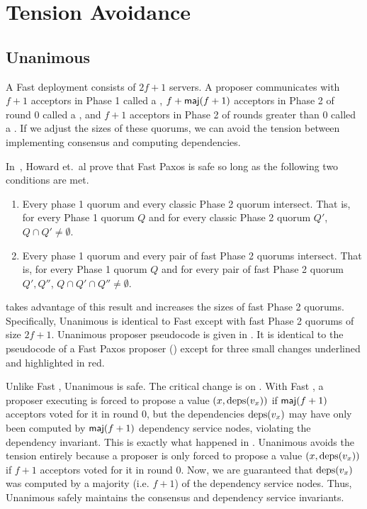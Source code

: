 \section{Tension Avoidance}

\subsection{Unanimous \BPaxos{}}
A Fast \BPaxos{} deployment consists of $2f+1$ servers. A proposer communicates
with $f+1$ acceptors in Phase 1 called a , $f +
\textsf{maj}(f+1)$ acceptors in Phase 2 of round $0$ called a , and $f + 1$ acceptors in Phase 2 of rounds greater than $0$ called a
. If we adjust the sizes of these quorums, we
can avoid the tension between implementing consensus and computing
dependencies.

In~\cite{howard2021fast}, Howard et.\ al prove that Fast Paxos is safe so long
as the following two conditions are met.
\begin{enumerate}
  \item
    Every phase 1 quorum and every classic Phase 2 quorum intersect. That is,
    for every Phase 1 quorum $Q$ and for every classic Phase 2 quorum $Q'$, $Q
    \cap Q' \neq \emptyset$.

  \item
    Every phase 1 quorum and every pair of fast Phase 2 quorums intersect. That
    is, for every Phase 1 quorum $Q$ and for every pair of fast Phase 2 quorum
    $Q', Q''$, $Q \cap Q' \cap Q'' \neq \emptyset$.
\end{enumerate}

{}

 takes advantage of this result and increases the
sizes of fast Phase 2 quorums. Specifically, Unanimous \BPaxos{} is identical
to Fast \BPaxos{} except with fast Phase 2 quorums of size $2f+1$. Unanimous
\BPaxos{} proposer pseudocode is given in . It
is identical to the pseudocode of a Fast Paxos proposer
() except for three small changes underlined and
highlighted in red.

Unlike Fast \BPaxos{}, Unanimous \BPaxos{} is safe. The critical change is on
. With Fast \BPaxos{}, a proposer executing
 is forced to propose a value $(x, \text{deps}(v_x))$ if
$\textsf{maj}(f+1)$ acceptors voted for it in round $0$, but the dependencies
$\text{deps}(v_x)$ may have only been computed by $\textsf{maj}(f+1)$ dependency service
nodes, violating the dependency invariant. This is exactly what happened in
. Unanimous \BPaxos{} avoids the tension entirely because
a proposer is only forced to propose a value $(x, \text{deps}(v_x))$ if $f+1$
acceptors voted for it in round $0$. Now, we are guaranteed that $\text{deps}(v_x)$
was computed by a majority (i.e. $f+1$) of the dependency service nodes. Thus,
Unanimous \BPaxos{} safely maintains the consensus and dependency service
invariants.


